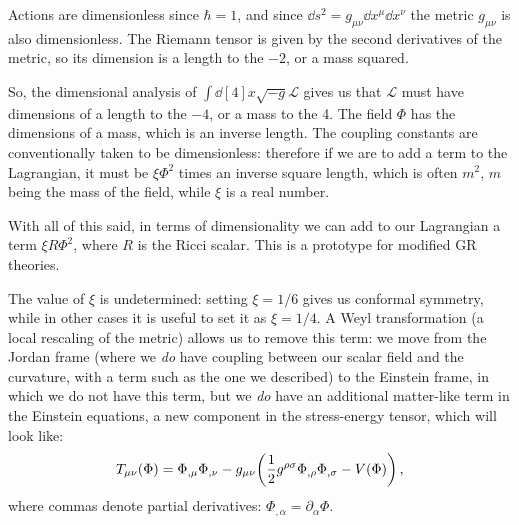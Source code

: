 \documentclass[main.tex]{subfiles}
\begin{document}





Actions are dimensionless since \(\hbar  =1\), and since \(\dd{s^2} = g_{\mu \nu } \dd{x^{\mu }} \dd{x^{\nu }}\) the metric \(g_{\mu \nu }\) is also dimensionless. 
The Riemann tensor is given by the second derivatives of the metric, so its dimension is a length to the \(-2\), or a mass squared.

So, the dimensional analysis of \(\int \dd[4]{x} \sqrt{-g} \mathscr{L}\) gives us that \(\mathscr{L}\) must have dimensions of a length to the \(-4\), or a mass to the 4.
The field \(\Phi \) has the dimensions of a mass, which is an inverse length.
The coupling constants are conventionally taken to be dimensionless: therefore if we are to add a term to the Lagrangian, it must be \( \xi \Phi^2 \) times an inverse square length, which is often \(m^2\), \(m \) being the mass of the field, while \(\xi \) is a real number.

With all of this said, in terms of dimensionality we can add to our Lagrangian a term \(\xi R \Phi^2\), where \(R\) is the Ricci scalar. 
This is a prototype for modified GR theories.

The value of \(\xi \) is undetermined: setting \(\xi = 1/6 \) gives us conformal symmetry, while in other cases it is useful to set it as \(\xi = 1/4 \). 
A Weyl transformation (a local rescaling of the metric) allows us \cite[]{faraoniConformalTransformationsClassical1998} to remove this term: we move from the Jordan frame (where we \emph{do} have coupling between our scalar field and the curvature, with a term such as the one we described) to the Einstein frame, in which we do not have this term, but we \emph{do} have an additional matter-like term in the Einstein equations, a new component in the stress-energy tensor, which will look like:
%
\begin{align}
  T_{\mu \nu } (\Phi ) = \Phi_{,  \mu } \Phi_{, \nu } - g_{\mu \nu } \qty(\frac{1}{2} g^{\rho \sigma } \Phi_{, \rho } \Phi_{, \sigma } - V(\Phi ))
\,,
\end{align}
%
where commas denote partial derivatives: \(\Phi_{,\alpha } = \partial_{\alpha } \Phi \).
\end{document}
